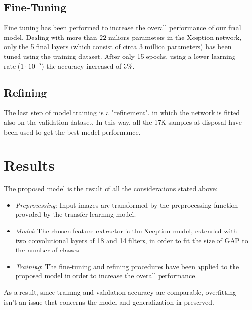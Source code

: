 \documentclass[conference]{IEEEtran}
\begin{document}
\subsection{Fine-Tuning}
Fine tuning has been performed to increase the overall performance of our final
model. Dealing with more than 22 milions parameters in the Xception network,
only the 5 final layers (which consist of circa 3 million parameters) has been tuned
using the training dataset. 
After only 15 epochs, using a lower learning rate ($1\cdot10^{-5}$) the accuracy increased
of 3\%. 
\subsection{Refining}
The last step of model training is a "refinement", in which the network is fitted
also on the validation dataset. In this way, all the 17K samples at
disposal have been used to get the best model performance.
\section{Results}
The proposed model is the result of all the considerations stated above:
\begin{itemize}
    \item \textit{Preprocessing}: Input images are transformed by the
    preprocessing function provided by the transfer-learning model.
    \item \textit{Model}: The chosen feature extractor is the Xception model,
    extended with two convolutional layers of 18 and 14 filters, in order to fit the
    size of GAP to the number of classes.
    \item \textit{Training}: The fine-tuning and refining procedures have been
    applied to the proposed model in order to increase the overall performance.
\end{itemize}
As a result, since training and validation accuracy are comparable, overfitting
isn't an issue that concerns the model and generalization in preserved. 
\end{document}
